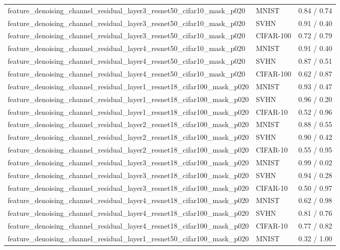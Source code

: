 \begin{tabular}{lll}
feature\_denoising\_channel\_residual\_layer3\_resnet50\_cifar10\_mask\_p020 & MNIST & 0.84 / 0.74 \\
feature\_denoising\_channel\_residual\_layer3\_resnet50\_cifar10\_mask\_p020 & SVHN & 0.91 / 0.40 \\
feature\_denoising\_channel\_residual\_layer3\_resnet50\_cifar10\_mask\_p020 & CIFAR-100 & 0.72 / 0.79 \\
feature\_denoising\_channel\_residual\_layer4\_resnet50\_cifar10\_mask\_p020 & MNIST & 0.91 / 0.40 \\
feature\_denoising\_channel\_residual\_layer4\_resnet50\_cifar10\_mask\_p020 & SVHN & 0.87 / 0.51 \\
feature\_denoising\_channel\_residual\_layer4\_resnet50\_cifar10\_mask\_p020 & CIFAR-100 & 0.62 / 0.87 \\
feature\_denoising\_channel\_residual\_layer1\_resnet18\_cifar100\_mask\_p020 & MNIST & 0.93 / 0.47 \\
feature\_denoising\_channel\_residual\_layer1\_resnet18\_cifar100\_mask\_p020 & SVHN & 0.96 / 0.20 \\
feature\_denoising\_channel\_residual\_layer1\_resnet18\_cifar100\_mask\_p020 & CIFAR-10 & 0.52 / 0.96 \\
feature\_denoising\_channel\_residual\_layer2\_resnet18\_cifar100\_mask\_p020 & MNIST & 0.88 / 0.55 \\
feature\_denoising\_channel\_residual\_layer2\_resnet18\_cifar100\_mask\_p020 & SVHN & 0.90 / 0.42 \\
feature\_denoising\_channel\_residual\_layer2\_resnet18\_cifar100\_mask\_p020 & CIFAR-10 & 0.55 / 0.95 \\
feature\_denoising\_channel\_residual\_layer3\_resnet18\_cifar100\_mask\_p020 & MNIST & 0.99 / 0.02 \\
feature\_denoising\_channel\_residual\_layer3\_resnet18\_cifar100\_mask\_p020 & SVHN & 0.94 / 0.28 \\
feature\_denoising\_channel\_residual\_layer3\_resnet18\_cifar100\_mask\_p020 & CIFAR-10 & 0.50 / 0.97 \\
feature\_denoising\_channel\_residual\_layer4\_resnet18\_cifar100\_mask\_p020 & MNIST & 0.62 / 0.98 \\
feature\_denoising\_channel\_residual\_layer4\_resnet18\_cifar100\_mask\_p020 & SVHN & 0.81 / 0.76 \\
feature\_denoising\_channel\_residual\_layer4\_resnet18\_cifar100\_mask\_p020 & CIFAR-10 & 0.77 / 0.82 \\
feature\_denoising\_channel\_residual\_layer1\_resnet50\_cifar100\_mask\_p020 & MNIST & 0.32 / 1.00 \\

\end{tabular}
